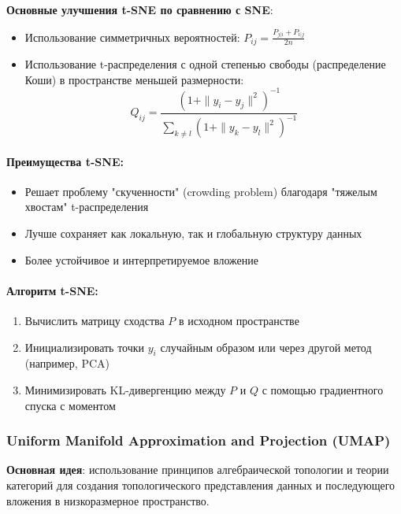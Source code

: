 \documentclass[a4paper,12pt]{article}
\begin{document}
\textbf{Основные улучшения t-SNE по сравнению с SNE}:
\begin{itemize}
    \item Использование симметричных вероятностей: $P_{ij} = \frac{P_{j|i} + P_{i|j}}{2n}$
    \item Использование t-распределения с одной степенью свободы (распределение Коши) в пространстве меньшей размерности:
    \begin{equation}
        Q_{ij} = \frac{(1 + \|y_i - y_j\|^2)^{-1}}{\sum_{k \neq l} (1 + \|y_k - y_l\|^2)^{-1}}
    \end{equation}
\end{itemize}

\paragraph{Преимущества t-SNE:}
\begin{itemize}
    \item Решает проблему "скученности" (crowding problem) благодаря "тяжелым хвостам" t-распределения
    \item Лучше сохраняет как локальную, так и глобальную структуру данных
    \item Более устойчивое и интерпретируемое вложение
\end{itemize}

\paragraph{Алгоритм t-SNE:}
\begin{enumerate}
    \item Вычислить матрицу сходства $P$ в исходном пространстве
    \item Инициализировать точки $y_i$ случайным образом или через другой метод (например, PCA)
    \item Минимизировать KL-дивергенцию между $P$ и $Q$ с помощью градиентного спуска с моментом
\end{enumerate}

\subsubsection{Uniform Manifold Approximation and Projection (UMAP)}

\textbf{Основная идея}: использование принципов алгебраической топологии и теории категорий для создания топологического представления данных и последующего вложения в низкоразмерное пространство.
\end{document}
